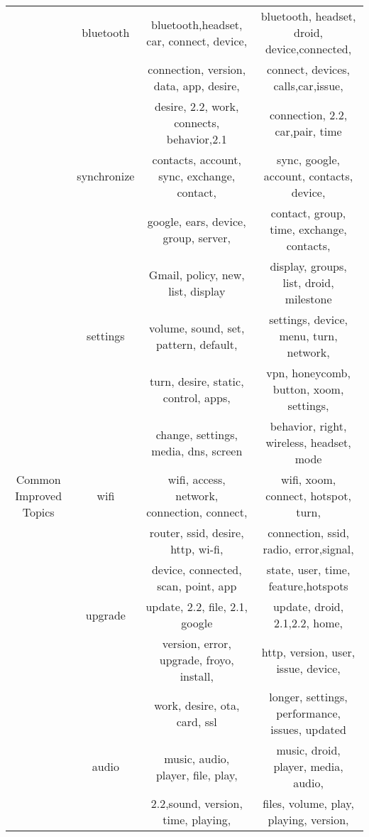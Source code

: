 \documentclass[10pt, conference, compsocconf]{IEEEtran}
\begin{document}
\begin{table*}[!htb]
\begin{tabular}{|c||c||c||c|}
& bluetooth & bluetooth,headset, car, connect, device,  &bluetooth,	headset, droid, device,connected, \\
 &&connection, version, data, app, desire, & connect, devices, calls,car,issue,	\\
&&desire,	2.2, work, connects, behavior,2.1 & connection, 2.2, car,pair, time\\ \cline{2-4}
            
  & synchronize&contacts, account, sync, exchange, contact, &sync, google, account, contacts, device, \\
&&google, ears, device, group, server, &contact, group, time, exchange, contacts, \\
&&Gmail, policy, new, list, display&display, groups,  list,  droid, milestone\\ \cline{2-4}
            
  & settings&volume, sound,	set, pattern,  default,&settings, device, menu, turn,	network, \\
 && turn, desire, static, control, apps,&vpn, honeycomb, button, xoom,  settings, \\
  && change, settings, media, dns, screen &behavior,	right, wireless, headset, mode\\
\hline

Common Improved Topics 
&wifi & wifi, access, network, connection, connect, &wifi, xoom, connect, hotspot, turn, \\
&&router, ssid, desire, http, wi-fi,&connection, ssid, radio, error,signal, \\

&&device, connected, scan, point, app &state, user, time, feature,hotspots\\ \cline{2-4}

&upgrade & update, 2.2, file, 2.1, google  & update, droid, 2.1,2.2, home, \\

 &&version, error, upgrade, froyo, install, & http, version, user, issue, device,\\           
 
 &&work, desire, ota, card, ssl & longer, settings, performance, issues, updated\\            \cline{2-4}
          
&audio& music, audio, player, file, play, &music, droid, player, media, audio,  \\

&&2.2,sound, version, time, playing, & files, volume, play, playing, version,\\


\end{tabular}
\end{table*}
\end{document}

